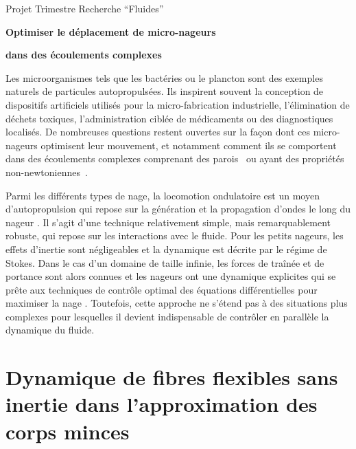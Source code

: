 \documentclass[a4paper,11pt]{article}
\begin{document}
\centerline{\large Projet Trimestre Recherche ``Fluides''}
\vspace{1cm}
\centerline{\Large \textbf{Optimiser le déplacement de micro-nageurs}}
\centerline{\Large \textbf{dans des écoulements complexes}}

\vspace{2cm}

Les microorganismes tels que les bactéries ou le plancton sont des exemples naturels de particules autopropulsées. Ils inspirent souvent la conception de dispositifs artificiels utilisés pour la micro-fabrication industrielle, l’élimination de déchets toxiques, l'administration ciblée de médica\-ments ou des diagnostiques localisés. De nombreuses questions restent ouvertes sur la façon dont ces micro-nageurs optimisent leur mouvement, et notamment comment ils se comportent dans des écoulements complexes comprenant des parois~\cite{crowdy2010two} ou ayant des propriétés non-newtoniennes~\cite{shen2011undulatory}.

Parmi les différents types de nage, la locomotion ondulatoire est un moyen d'autopropulsion qui repose sur la génération et la propagation d'ondes le long du nageur \cite{cohen2010swimming}. Il s’agit d’une technique relativement simple, mais remarquablement robuste, qui repose sur les interactions avec le fluide. Pour les petits nageurs, les effets d’inertie sont négligeables et la dynamique est décrite par le régime de Stokes. Dans le cas d’un domaine de taille infinie, les forces de traînée et de portance sont alors connues et les nageurs ont une dynamique explicites qui se prête aux techniques de contrôle optimal des équations différentielles pour maximiser la nage \cite{alouges2013self,berti2020swimming}. Toutefois, cette approche ne s’étend pas à des situations plus complexes pour lesquelles il devient indispensable de contrôler en parallèle la dynamique du fluide.

\section{Dynamique de fibres flexibles sans inertie dans l'approximation des corps minces}
\end{document}
